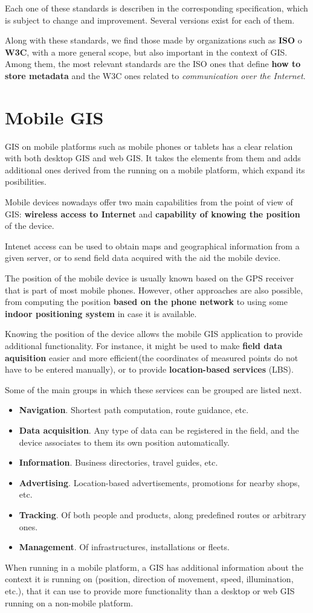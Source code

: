 Each one of these standards is describen in the corresponding specification, which is subject to change and improvement. Several versions exist for each of them.

Along with these standards, we find those made by organizations such as \textbf{ISO} o \textbf{W3C}, with a more general scope, but also important in the context of GIS. Among them, the most relevant standards are the ISO ones that define \textbf{how to store metadata} and the W3C ones related to \emph{communication over the Internet}.

\section{Mobile GIS}

GIS on mobile platforms such as mobile phones or tablets has a clear relation with both desktop GIS and web GIS. It takes the elements from them and adds  additional ones derived from the running on a mobile platform, which expand its posibilities.

Mobile devices nowadays offer two main capabilities from the point of view of GIS: \textbf{wireless access to Internet} and \textbf{capability of knowing the position} of the device. 

Intenet access can be used to obtain maps and geographical information from a given server, or to send field data acquired with the aid the mobile device.

The position of the mobile device is usually known based on the GPS receiver that is part of most mobile phones. However, other approaches are also possible, from computing the position \textbf{based on the phone network} to using some \textbf{indoor positioning system} in case it is available.

Knowing the position of the device allows the mobile GIS application to provide additional functionality. For instance, it might be used to make \textbf{field data aquisition} easier and more efficient(the coordinates of measured points do not have to be entered manually), or to provide \textbf{location-based services} (LBS).  

Some of the main groups in which these services can be grouped are listed next.

\begin{itemize}
	\item \textbf{Navigation}. Shortest path computation, route guidance, etc.
\item \textbf{Data acquisition}. Any type of data can be registered in the field, and the device associates to them its own position automatically.
\item \textbf{Information}. Business directories, travel guides, etc.
\item \textbf{Advertising}. Location-based advertisements, promotions for nearby shops, etc.
\item \textbf{Tracking}. Of both people and products, along predefined routes or arbitrary ones.
\item \textbf{Management}. Of infrastructures, installations or fleets.
\end{itemize}

When running in a mobile platform, a GIS has additional information about the context it is running on (position, direction of movement, speed, illumination, etc.), that it can use to provide more functionality than a desktop or web GIS running on a non-mobile platform.

\pagestyle{empty}
